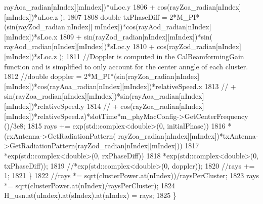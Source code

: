 \begin{DoxyCode}
      rayAoa\_radian[nIndex][mIndex])*uLoc.y
1806                                                                 + cos(rayZoa\_radian[nIndex][mIndex])*uLoc.z
      );
1807 
1808                                                 \textcolor{keywordtype}{double} txPhaseDiff = 2*M\_PI*(sin(rayZod\_radian[nIndex][
      mIndex])*cos(rayAod\_radian[nIndex][mIndex])*sLoc.x
1809                                                                 + sin(rayZod\_radian[nIndex][mIndex])*sin(
      rayAod\_radian[nIndex][mIndex])*sLoc.y
1810                                                                 + cos(rayZod\_radian[nIndex][mIndex])*sLoc.z
      );
1811                                                 \textcolor{comment}{//Doppler is computed in the CalBeamformingGain function
       and is simplified to only account for the center anngle of each cluster.}
1812                                                 \textcolor{comment}{//double doppler =
       2*M\_PI*(sin(rayZoa\_radian[nIndex][mIndex])*cos(rayAoa\_radian[nIndex][mIndex])*relativeSpeed.x}
1813                                                 \textcolor{comment}{//              +
       sin(rayZoa\_radian[nIndex][mIndex])*sin(rayAoa\_radian[nIndex][mIndex])*relativeSpeed.y}
1814                                                 \textcolor{comment}{//              +
       cos(rayZoa\_radian[nIndex][mIndex])*relativeSpeed.z)*slotTime*m\_phyMacConfig->GetCenterFrequency ()/3e8;}
1815                                                 rays += exp(std::complex<double>(0, initialPhase))
1816                                                                 *(rxAntenna->GetRadiationPattern(
      rayZoa\_radian[nIndex][mIndex])*txAntenna->GetRadiationPattern(rayZod\_radian[nIndex][mIndex]))
1817                                                                 *exp(std::complex<double>(0, rxPhaseDiff))
1818                                                                 *exp(std::complex<double>(0, txPhaseDiff));
1819                                                                 \textcolor{comment}{//*exp(std::complex<double>(0, doppler));}
1820                                                 \textcolor{comment}{//rays += 1;}
1821                                         \}
1822                                         \textcolor{comment}{//rays *= sqrt(clusterPower.at(nIndex))/raysPerCluster;}
1823                                         rays *= sqrt(clusterPower.at(nIndex)/raysPerCluster);
1824                                         H\_usn.at(uIndex).at(sIndex).at(nIndex) = rays;
1825                                 \}

\end{DoxyCode}
